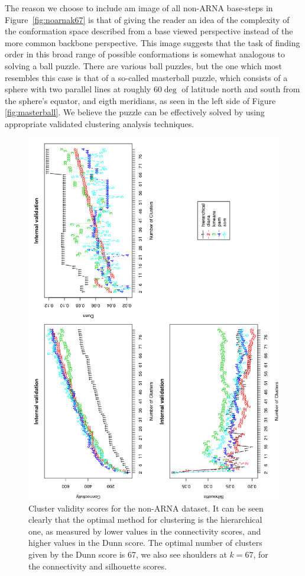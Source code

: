 The reason we choose to include am image of all non-ARNA base-steps
in Figure~\ref{fig:noarnak67} is that of  giving the reader an idea of
the complexity of the conformation space described from
a  base  viewed  perspective  instead  of  the  more  common  backbone
perspective. This image suggests that the task of finding order in this
broad range of possible conformations is somewhat analogous to solving
a ball puzzle. There are various ball puzzles, but the one which most
resembles this  case is that  of a so-called masterball  puzzle, which
consists of  a sphere with two  parallel lines at  roughly 60$\deg$ of
latitude  north  and  south  from  the  sphere's  equator,  and  eigth
meridians,    as    seen    in     the    left    side    of    Figure
\ref{fig:masterball}. We believe the puzzle can be effectively solved
by using appropriate validated clustering analysis techniques.


\begin{figure}
 \centering
\includegraphics[angle=0, scale=0.72]{Chapter2/noarna_val.png}
\caption{Cluster validity  scores for the non-ARNA dataset.  It can be
  seen  clearly  that  the   optimal  method  for  clustering  is  the
  hierarchical one,  as measured by  lower values in  the connectivity
  scores, and higher  values in the Dunn score.  The optimal number of
  clusters given  by the Dunn  score is 67,  we also see  shoulders at
  $k=67$, for the connectivity and silhouette scores.}
 \label{fig:noarna}
\end{figure}

